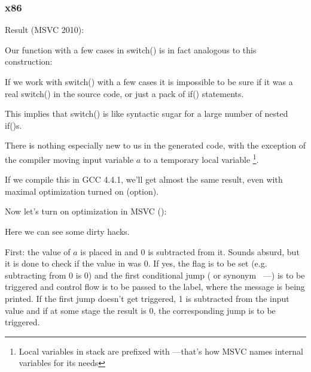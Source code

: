 \subsubsection{x86}


Result (MSVC 2010):



Our function with a few cases in switch() is in fact analogous to this construction:




If we work with switch() with a few cases it is impossible to be sure if it was
a real switch() in the source code, or just a pack of if() statements.
\myindex{\SyntacticSugar}

This implies that switch() is like syntactic sugar for a large number of nested if()s.

There is nothing especially new to us in the generated code,
with the exception of the compiler moving input variable $a$ to a temporary local variable 
\footnote{Local variables in stack are prefixed with ---that's how MSVC names internal variables for its needs}.

If we compile this in GCC 4.4.1, we'll get almost the same result, even with maximal optimization
turned on (\Othree option).


Now let's turn on optimization in MSVC (\Ox): 

\label{JMP_instead_of_RET}


Here we can see some dirty hacks.


First: the value of $a$ is placed in \EAX and 0 is subtracted from it. Sounds absurd, but it is done to check if 
the value in \EAX was 0. If yes, the \ZF flag is to be set (e.g. subtracting from 0 is 0) 
and the first conditional jump \JE ( or synonym \JZ~---) is to be triggered 
and control flow is to be passed to the  label, where the  message is being printed. 
If the first jump doesn't get triggered, 1 is subtracted from the input value and if at some stage the result is 0, 
the corresponding jump is to be triggered.

